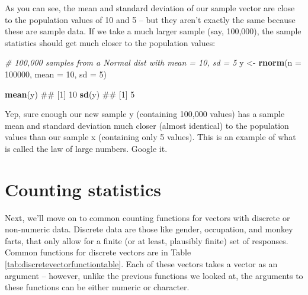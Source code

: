 \documentclass[]{book}
\newenvironment{Shaded}{\begin{snugshade}}{\end{snugshade}}
\newcommand{\KeywordTok}[1]{\textcolor[rgb]{0.13,0.29,0.53}{\textbf{#1}}}
\newcommand{\DataTypeTok}[1]{\textcolor[rgb]{0.13,0.29,0.53}{#1}}
\newcommand{\DecValTok}[1]{\textcolor[rgb]{0.00,0.00,0.81}{#1}}
\newcommand{\StringTok}[1]{\textcolor[rgb]{0.31,0.60,0.02}{#1}}
\newcommand{\CommentTok}[1]{\textcolor[rgb]{0.56,0.35,0.01}{\textit{#1}}}
\newcommand{\NormalTok}[1]{#1}
\theoremstyle{definition}
\theoremstyle{definition}
\theoremstyle{remark}
\begin{document}
As you can see, the mean and standard deviation of our sample vector are
close to the population values of 10 and 5 -- but they aren't exactly
the same because these are sample data. If we take a much larger sample
(say, 100,000), the sample statistics should get much closer to the
population values:

\begin{Shaded}
\begin{Highlighting}[]
\CommentTok{# 100,000 samples from a Normal dist with mean = 10, sd = 5}
\NormalTok{y <-}\StringTok{ }\KeywordTok{rnorm}\NormalTok{(}\DataTypeTok{n =} \DecValTok{100000}\NormalTok{, }\DataTypeTok{mean =} \DecValTok{10}\NormalTok{, }\DataTypeTok{sd =} \DecValTok{5}\NormalTok{)}

\KeywordTok{mean}\NormalTok{(y)}
\NormalTok{## [1] 10}
\KeywordTok{sd}\NormalTok{(y)}
\NormalTok{## [1] 5}
\end{Highlighting}
\end{Shaded}

Yep, sure enough our new sample y (containing 100,000 values) has a
sample mean and standard deviation much closer (almost identical) to the
population values than our sample x (containing only 5 values). This is
an example of what is called the law of large numbers. Google it.

\section{Counting statistics}\label{counting-statistics}

Next, we'll move on to common counting functions for vectors with
discrete or non-numeric data. Discrete data are those like gender,
occupation, and monkey farts, that only allow for a finite (or at least,
plausibly finite) set of responses. Common functions for discrete
vectors are in Table \ref{tab:discretevectorfunctiontable}. Each of
these vectors takes a vector as an argument -- however, unlike the
previous functions we looked at, the arguments to these functions can be
either numeric or character.
\end{document}
